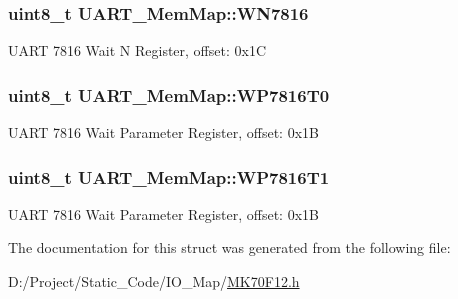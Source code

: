 \subsubsection[{W\+N7816}]{\setlength{\rightskip}{0pt plus 5cm}uint8\+\_\+t U\+A\+R\+T\+\_\+\+Mem\+Map\+::\+W\+N7816}\label{struct_u_a_r_t___mem_map_aed09f864d4f1afe57f146ff72949c3d2}
U\+A\+R\+T 7816 Wait N Register, offset\+: 0x1\+C \hypertarget{struct_u_a_r_t___mem_map_a4555ab88b0e4f56c44b30d549b5b0666}{}
\subsubsection[{W\+P7816\+T0}]{\setlength{\rightskip}{0pt plus 5cm}uint8\+\_\+t U\+A\+R\+T\+\_\+\+Mem\+Map\+::\+W\+P7816\+T0}\label{struct_u_a_r_t___mem_map_a4555ab88b0e4f56c44b30d549b5b0666}
U\+A\+R\+T 7816 Wait Parameter Register, offset\+: 0x1\+B \hypertarget{struct_u_a_r_t___mem_map_a7d456ca4a3be9b4c083253fe2d30d404}{}
\subsubsection[{W\+P7816\+T1}]{\setlength{\rightskip}{0pt plus 5cm}uint8\+\_\+t U\+A\+R\+T\+\_\+\+Mem\+Map\+::\+W\+P7816\+T1}\label{struct_u_a_r_t___mem_map_a7d456ca4a3be9b4c083253fe2d30d404}
U\+A\+R\+T 7816 Wait Parameter Register, offset\+: 0x1\+B 

The documentation for this struct was generated from the following file\+:\begin{DoxyCompactItemize}
\item 
D\+:/\+Project/\+Static\+\_\+\+Code/\+I\+O\+\_\+\+Map/\hyperlink{_m_k70_f12_8h}{M\+K70\+F12.\+h}\end{DoxyCompactItemize}
